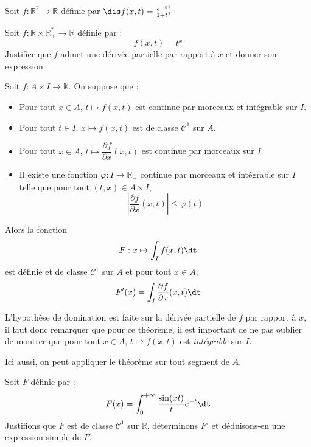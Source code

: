 \documentclass[a4paper,10pt]{report}
\begin{document}
\medskip

\begin{ex} Soit $f : \mathbb{R}^2 \rightarrow \mathbb{R}$ définie par $\dis f(x,t) = \frac{e^{-xt}}{1+t^2}\cdot$

\vspace{4cm}
\end{ex}

\begin{exa} Soit $f : \mathbb{R} \times \mathbb{R}_+^{*} \rightarrow \mathbb{R}$ définie par :
$$ f(x,t) = t^x$$
Justifier que $f$ admet une dérivée partielle par rapport à $x$ et donner son expression. 
\end{exa}

\begin{thm}
Soit $f : A \times I \rightarrow \mathbb{K}$. On suppose que :
\begin{itemize}
\item Pour tout $x \in A$, $t \mapsto f(x,t)$ est continue par morceaux et intégrable sur $I$.
\item Pour tout $t \in I$, $x \mapsto f(x,t)$ est de classe $\mathcal{C}^1$ sur $A$.
\item Pour tout $x \in A$, $t \mapsto \dfrac{\partial f}{\partial x}(x,t)$ est continue par morceaux sur $I$.
\item Il existe une fonction $\varphi : I \rightarrow \mathbb{R}_+$ continue par morceaux et intégrable sur $I$ telle que pour tout $(t,x) \in A \times I$,
$$ \left\vert \dfrac{\partial f}{\partial x}(x,t) \right\vert \leq \varphi(t)$$
\end{itemize}
Alors la fonction 
$$ F : x \mapsto \int_{I} f(x,t) \dt$$
est définie et de classe $\mathcal{C}^1$ sur $A$ et pour tout $x \in A$,
$$ F'(x) = \int_{I}  \dfrac{\partial f}{\partial x}(x,t) \dt$$
\end{thm}

\begin{rems}
\item L'hypothèse de domination est faite sur la dérivée partielle de $f$ par rapport à $x$, il faut donc remarquer que pour ce théorème, il est important de ne pas oublier de montrer que pour tout $x \in A$, $t \mapsto f(x,t)$ est \textit{intégrable} sur $I$. 
\item Ici aussi, on peut appliquer le théorème sur tout segment de $A$.
\end{rems}

\begin{ex} Soit $F$ définie par :
$$ F(x) = \int_{0}^{+ \infty} \frac{\sin(xt)}{t} e^{-t} \dt$$
Justifions que $F$ est de classe $\mathcal{C}^1$ sur $\mathbb{R}$, déterminons $F'$ et déduisons-en une expression simple de $F$.

\vspace{10cm}
\end{ex}
\end{document}
